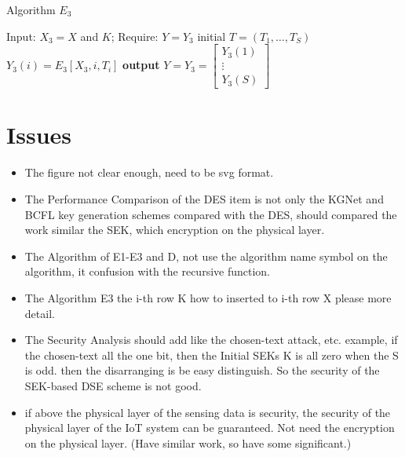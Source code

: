 \documentclass[a4paper]{article}
\begin{document}
\begin{algorithm}
  \caption{Algorithm $E_3$}
  \begin{algorithmic}[1]
    \REQUIRE Input: $X_3=X$ and $K$; Require: $Y=Y_3$
    \STATE initial $T = (T_1, \ldots, T_S)$
    \STATE $Y_3(i) = E_3[X_3, i, T_i]$
    \ENDFOR
    \STATE \textbf{output} $Y = Y_3 =
    \begin{bmatrix}
      Y_3(1) \\
      \vdots \\
      Y_3(S)
    \end{bmatrix}$
  \end{algorithmic}
\end{algorithm}

\section{Issues}

\begin{itemize}
  \item The figure not clear enough, need to be svg format.
  \item The Performance Comparison of the DES item is not only the KGNet and BCFL key generation schemes compared with the DES, should compared the work similar the SEK, which encryption on the physical layer.
  \item The Algorithm of E1-E3 and D, not use the algorithm name symbol on the algorithm, it confusion with the recursive function.
  \item The Algorithm E3 the i-th row K how to inserted to i-th row X please more detail.
  \item The Security Analysis should add like the chosen-text attack, etc. example,  if the chosen-text all the one bit, then the Initial SEKs K is all zero when the S is odd. then the disarranging is be easy distinguish. So the security of the SEK-based DSE scheme is not good.
  \item if above the physical layer of the sensing data is security, the security of the physical layer of the IoT system can be guaranteed. Not need the encryption on the physical layer. (Have similar work, so have some significant.)
\end{itemize}

% 
\end{document}
